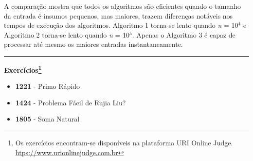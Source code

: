 A comparação mostra que todos os algoritmos são eficientes quando o tamanho da entrada é insumos pequenos, mas maiores, trazem diferenças notáveis nos tempos de execução dos algoritmos. Algoritmo 1 torna-se lento quando \textit{n} = 10$^4$ e Algoritmo 2 torna-se lento quando \textit{n} = 10$^5$. Apenas o Algoritmo 3 é capaz de processar até mesmo os maiores entradas instantaneamente.

\rule{\textwidth}{0.4pt}
\large{\textbf{Exercícios\footnote{Os exercícios encontram-se disponíveis na plataforma URI Online Judge. \url{htps://www.urionlinejudge.com.br}}}}\\

\begin{itemize}
    \item \textbf{1221} - Primo Rápido
    \item \textbf{1424} - Problema Fácil de Rujia Liu?
    \item \textbf{1805} - Soma Natural
\end{itemize}

\newpage
